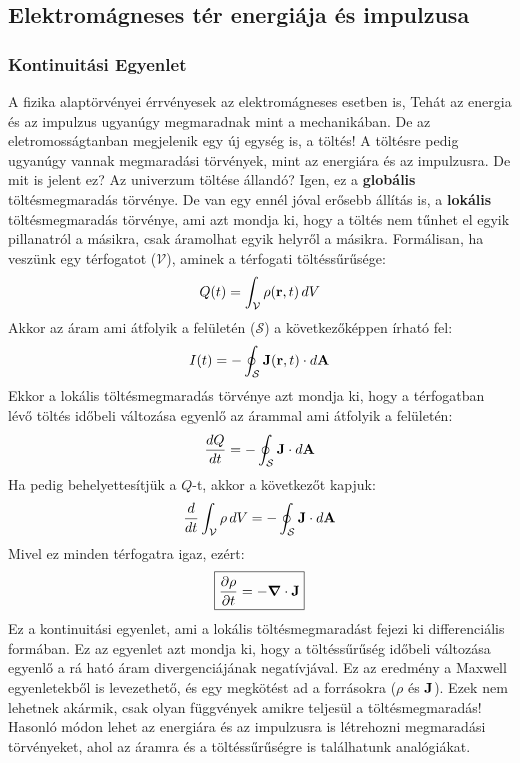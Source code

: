 \documentclass[a4paper,12pt]{article}
\begin{document}
\subsection{Elektromágneses tér energiája és impulzusa}
\subsubsection{Kontinuitási Egyenlet}
A fizika alaptörvényei érrvényesek az elektromágneses esetben is, Tehát az energia és az impulzus ugyanúgy megmaradnak mint a mechanikában. De az eletromosságtanban megjelenik egy új egység is,
a töltés! A töltésre pedig ugyanúgy vannak megmaradási törvények, mint az energiára és az impulzusra. De mit is jelent ez? Az univerzum töltése állandó? Igen, ez a \textbf{globális} töltésmegmaradás törvénye.
De van egy ennél jóval erősebb állítás is, a \textbf{lokális} töltésmegmaradás törvénye, ami azt mondja ki, hogy a töltés nem tűnhet el egyik pillanatról a másikra, csak áramolhat egyik helyről a másikra.
Formálisan, ha veszünk egy térfogatot ($\mathcal{V}$), aminek a térfogati töltéssűrűsége:
\begin{equation}
    Q(t) = \int_{\mathcal{V}} \rho(\bold{r}, t) \, dV
\end{equation}
Akkor az áram ami átfolyik a felületén ($\mathcal{S}$) a következőképpen írható fel:
\begin{equation}
    I(t) = - \oint_{\mathcal{S}} \bold{J}(\bold{r}, t) \cdot d\bold{A}
\end{equation}
Ekkor a lokális töltésmegmaradás törvénye azt mondja ki, hogy a térfogatban lévő töltés időbeli változása egyenlő az árammal ami átfolyik a felületén:
\begin{equation}
    \frac{dQ}{dt} = - \oint_{\mathcal{S}} \bold{J} \cdot d\bold{A}
\end{equation}
Ha pedig behelyettesítjük a $Q$-t, akkor a következőt kapjuk:
\begin{equation}
    \frac{d}{dt} \int_{\mathcal{V}} \rho \, dV = - \oint_{\mathcal{S}} \bold{J} \cdot d\bold{A}
\end{equation}
Mivel ez minden térfogatra igaz, ezért:
\begin{equation}
    \boxed{\frac{\partial \rho}{\partial t} = -  \boldsymbol{\nabla} \cdot \bold{J}}
\end{equation}
Ez a kontinuitási egyenlet, ami a lokális töltésmegmaradást fejezi ki differenciális formában. Ez az egyenlet azt mondja ki, hogy a töltéssűrűség időbeli változása egyenlő a rá ható áram divergenciájának negatívjával.
Ez az eredmény a Maxwell egyenletekből is levezethető, és egy megkötést ad a forrásokra ($\rho$ és $\bold{J}$). Ezek nem lehetnek akármik, csak olyan függvények amikre teljesül a töltésmegmaradás!
Hasonló módon lehet az energiára és az impulzusra is létrehozni megmaradási törvényeket, ahol az áramra és a töltéssűrűségre is találhatunk analógiákat.
\end{document}

